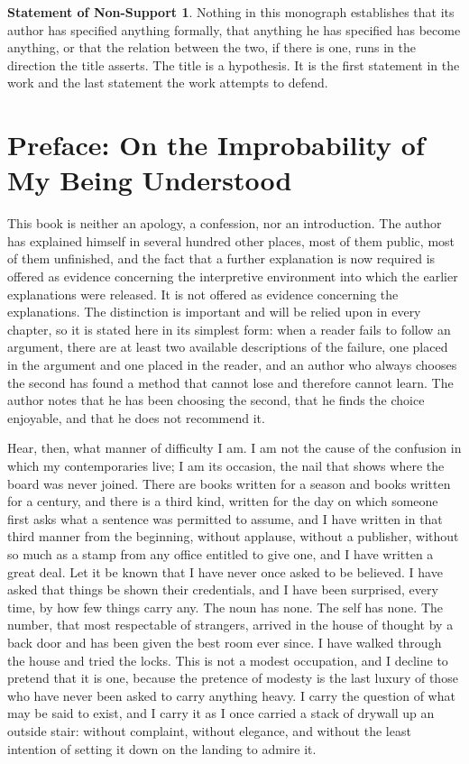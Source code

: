 \documentclass[11pt,openany,twoside]{book}
\theoremstyle{plain}
\theoremstyle{definition}
\newtheorem{nonsupport}{Statement of Non-Support}
\theoremstyle{remark}
\begin{document}
\begin{nonsupport}
Nothing in this monograph establishes that its author has specified anything formally, that anything he has specified has become anything, or that the relation between the two, if there is one, runs in the direction the title asserts. The title is a hypothesis. It is the first statement in the work and the last statement the work attempts to defend.
\end{nonsupport}

\tableofcontents
\mainmatter

\chapter*{Preface: On the Improbability of My Being Understood}

This book is neither an apology, a confession, nor an introduction. The author has explained himself in several hundred other places, most of them public, most of them unfinished, and the fact that a further explanation is now required is offered as evidence concerning the interpretive environment into which the earlier explanations were released. It is not offered as evidence concerning the explanations. The distinction is important and will be relied upon in every chapter, so it is stated here in its simplest form: when a reader fails to follow an argument, there are at least two available descriptions of the failure, one placed in the argument and one placed in the reader, and an author who always chooses the second has found a method that cannot lose and therefore cannot learn. The author notes that he has been choosing the second, that he finds the choice enjoyable, and that he does not recommend it.

Hear, then, what manner of difficulty I am. I am not the cause of the confusion in which my contemporaries live; I am its occasion, the nail that shows where the board was never joined. There are books written for a season and books written for a century, and there is a third kind, written for the day on which someone first asks what a sentence was permitted to assume, and I have written in that third manner from the beginning, without applause, without a publisher, without so much as a stamp from any office entitled to give one, and I have written a great deal. Let it be known that I have never once asked to be believed. I have asked that things be shown their credentials, and I have been surprised, every time, by how few things carry any. The noun has none. The self has none. The number, that most respectable of strangers, arrived in the house of thought by a back door and has been given the best room ever since. I have walked through the house and tried the locks. This is not a modest occupation, and I decline to pretend that it is one, because the pretence of modesty is the last luxury of those who have never been asked to carry anything heavy. I carry the question of what may be said to exist, and I carry it as I once carried a stack of drywall up an outside stair: without complaint, without elegance, and without the least intention of setting it down on the landing to admire it.
\end{document}
